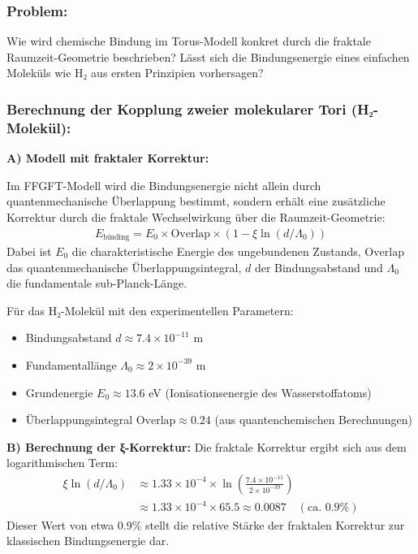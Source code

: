 	\subsubsection*{Problem:}
	Wie wird chemische Bindung im Torus-Modell konkret durch die fraktale Raumzeit-Geometrie beschrieben? Lässt sich die Bindungsenergie eines einfachen Moleküls wie H₂ aus ersten Prinzipien vorhersagen?
	
	\subsubsection*{Berechnung der Kopplung zweier molekularer Tori (H₂-Molekül):}
	
	\textbf{A) Modell mit fraktaler Korrektur:}
	
	Im FFGFT-Modell wird die Bindungsenergie nicht allein durch quantenmechanische Überlappung bestimmt, sondern erhält eine zusätzliche Korrektur durch die fraktale Wechselwirkung über die Raumzeit-Geometrie:
	\begin{align*}
		E_{\text{binding}} = E_0 \times \text{Overlap} \times \left(1 - \xi \ln(d/\Lambda_0)\right)
	\end{align*}
	Dabei ist $E_0$ die charakteristische Energie des ungebundenen Zustands, $\text{Overlap}$ das quantenmechanische Überlappungsintegral, $d$ der Bindungsabstand und $\Lambda_0$ die fundamentale sub-Planck-Länge.
	
	Für das H₂-Molekül mit den experimentellen Parametern:
	\begin{itemize}
		\item Bindungsabstand $d \approx 7.4 \times 10^{-11}$ m
		\item Fundamentallänge $\Lambda_0 \approx 2 \times 10^{-39}$ m
		\item Grundenergie $E_0 \approx 13.6$ eV (Ionisationsenergie des Wasserstoffatoms)
		\item Überlappungsintegral $\text{Overlap} \approx 0.24$ (aus quantenchemischen Berechnungen)
	\end{itemize}
	
	\textbf{B) Berechnung der ξ-Korrektur:}
	Die fraktale Korrektur ergibt sich aus dem logarithmischen Term:
	\begin{align*}
		\xi \ln(d/\Lambda_0) &\approx 1.33 \times 10^{-4} \times \ln\left(\frac{7.4 \times 10^{-11}}{2 \times 10^{-39}}\right) \\
		&\approx 1.33 \times 10^{-4} \times 65.5 \approx 0.0087 \quad (\text{ca. } 0.9\%)
	\end{align*}
	Dieser Wert von etwa 0.9\% stellt die relative Stärke der fraktalen Korrektur zur klassischen Bindungsenergie dar.
	

